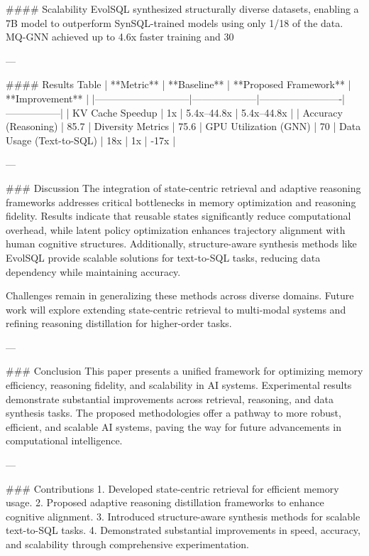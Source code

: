 #### Scalability  
EvolSQL synthesized structurally diverse datasets, enabling a 7B model to outperform SynSQL-trained models using only 1/18 of the data. MQ-GNN achieved up to 4.6x faster training and 30%

---

#### Results Table  
| **Metric**                 | **Baseline**       | **Proposed Framework** | **Improvement** |
|-----------------------------|--------------------|-------------------------|-----------------|
| KV Cache Speedup           | 1x                | 5.4x–44.8x             | 5.4x–44.8x      |
| Accuracy (Reasoning)       | 85.7%
| Diversity Metrics          | 75.6%
| GPU Utilization (GNN)      | 70%
| Data Usage (Text-to-SQL)   | 18x               | 1x                     | -17x            |

---

### Discussion  
The integration of state-centric retrieval and adaptive reasoning frameworks addresses critical bottlenecks in memory optimization and reasoning fidelity. Results indicate that reusable states significantly reduce computational overhead, while latent policy optimization enhances trajectory alignment with human cognitive structures. Additionally, structure-aware synthesis methods like EvolSQL provide scalable solutions for text-to-SQL tasks, reducing data dependency while maintaining accuracy.

Challenges remain in generalizing these methods across diverse domains. Future work will explore extending state-centric retrieval to multi-modal systems and refining reasoning distillation for higher-order tasks.

---

### Conclusion  
This paper presents a unified framework for optimizing memory efficiency, reasoning fidelity, and scalability in AI systems. Experimental results demonstrate substantial improvements across retrieval, reasoning, and data synthesis tasks. The proposed methodologies offer a pathway to more robust, efficient, and scalable AI systems, paving the way for future advancements in computational intelligence.

---

### Contributions  
1. Developed state-centric retrieval for efficient memory usage.
2. Proposed adaptive reasoning distillation frameworks to enhance cognitive alignment.
3. Introduced structure-aware synthesis methods for scalable text-to-SQL tasks.
4. Demonstrated substantial improvements in speed, accuracy, and scalability through comprehensive experimentation.